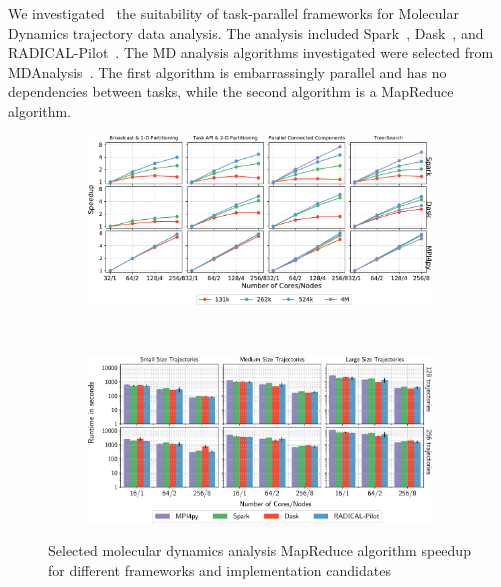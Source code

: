 We investigated~\cite{paraskevakos2018task} the suitability of task-parallel frameworks for Molecular Dynamics trajectory data analysis. 
The analysis included Spark~\cite{zaharia2010spark}, Dask~\cite{rocklin2015dask}, and RADICAL-Pilot~\cite{merzky2019using}. 
The MD analysis algorithms investigated were selected from MDAnalysis~\cite{gowers2016mdanalysis,michaud2011mdanalysis}. 
The first algorithm is embarrassingly parallel and has no dependencies between tasks, while the second algorithm is a MapReduce algorithm.

\begin{figure}[t]
    \centering
    \begin{subfigure}[b]{0.45\textwidth}
        \includegraphics[width=.95\textwidth]{figures/All4approachesWith4MSpeedup.pdf}
        \caption{}
        \label{fig:leafletfinder}
    \end{subfigure}%
    ~ 
    \begin{subfigure}[b]{0.45\textwidth}
        \includegraphics[width=\linewidth]{figures/HausdorffSingleFig.pdf}
        \caption{}
        \label{fig:hausdorff}
    \end{subfigure}
    \caption{Selected molecular dynamics analysis MapReduce algorithm speedup 
    for different frameworks and implementation candidates}\label{fig:md_analysis}
\end{figure}

